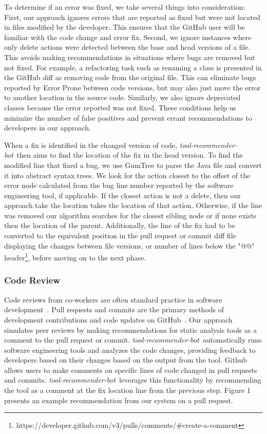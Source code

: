\documentclass[sigconf,review,anonymous]{acmart}
\newcommand{\tool}{\textsl{tool-recommender-bot}}
\begin{document}
To determine if an error was fixed, we take several things into consideration: First, our approach ignores errors that are reported as fixed but were not located in files modified by the developer. This ensures that the GitHub user will be familiar with the code change and error fix. Second, we ignore instances where only delete actions were detected between the base and head versions of a file. This avoids making recommendations in situations where bugs are removed but not fixed. For example, a refactoring task such as renaming a class is presented in the GitHub diff as removing code from the original file. This can eliminate bugs reported by Error Prone between code versions, but may also just move the error to another location in the source code. Similarly, we also ignore deprecated classes because the error reported was not fixed. These conditions help us minimize the number of false positives and prevent errant recommendations to developers in our approach.

When a fix is identified in the changed version of code, \tool~then aims to find the location of the fix in the head version. To find the modified line that fixed a bug, we use GumTree to parse the Java file and convert it into abstract syntax trees. We look for the action closest to the offset of the error node calculated from the bug line number reported by the software engineering tool, if applicable. If the closest action is not a delete, then our approach take the location takes the location of that action. Otherwise, if the line was removed our algorithm searches for the closest sibling node or if none exists then the location of the parent. Additionally, the line of the fix had to be converted to the equivalent position in the pull request or commit diff file displaying the changes between file versions, or number of lines below the "@@" header\footnote{https://developer.github.com/v3/pulls/comments/\#create-a-comment}, before moving on to the next phase.

\subsubsection{Code Review}

Code reviews from co-workers are often standard practice in software development~\cite{CBirdCodeReviewingTrenches}. Pull requests and commits are the primary methods of development contributions and code updates on GitHub~\cite{PullRequestReview}. Our approach simulates peer reviews by making recommendations for static analysis tools as a comment to the pull request or commit. \tool~automatically runs software engineering tools and analyzes the code changes, providing feedback to developers based on their changes based on the output from the tool. Github allows users to make comments on specific lines of code changed in pull requests and commits. \tool~leverages this functionality by recommending the tool as a comment at the fix location line from the previous step. Figure 1 presents an example recommendation from our system on a pull request. %
\end{document}
